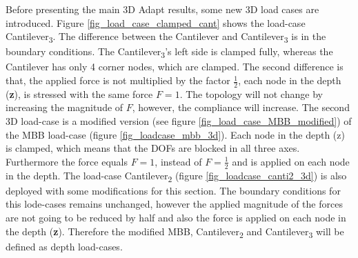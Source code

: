 Before presenting the main 3D Adapt results,
some new 3D load cases are introduced.
 Figure \ref{fig_load_case_clamped_cant} 
 shows the load-case Cantilever\textsubscript{3}. The difference between the Cantilever and
 Cantilever\textsubscript{3} is in the boundary 
conditions. The Cantilever\textsubscript{3}'s left side is 
 clamped fully, whereas the Cantilever has only 4 corner  
 nodes, which are clamped. The second difference 
 is that, the applied force is not multiplied by the 
 factor $\frac{1}{2}$, each node in the depth (\textbf{z}),
  is stressed with the same force \textbf{$F = 1$}. The 
 topology will not change by increasing the 
 magnitude of $F$, however, the compliance will increase.
 The second 3D load-case is a modified version 
 (see figure \ref{fig_load_case_MBB_modified}) of the 
 MBB load-case (figure \ref{fig_loadcase_mbb_3d}).
 Each node in the depth (z) is clamped, which means
 that the DOFs are blocked in all three axes. Furthermore
 the force equals $F = 1$, instead of $F = \frac{1}{2}$ and is applied on
 each node in the depth. The 
 load-case Cantilever\textsubscript{2} 
 (figure \ref{fig_loadcase_canti2_3d}) is also 
 deployed with some modifications for this section. 
 The boundary conditions for this lode-cases remains 
 unchanged, however the applied magnitude of the 
 forces are not going to be reduced by half and also 
 the force is applied on each 
 node in the depth (\textbf{z}). Therefore the 
 modified MBB, Cantilever\textsubscript{2} and
  Cantilever\textsubscript{3}  will be 
 defined as depth load-cases.\\
 
